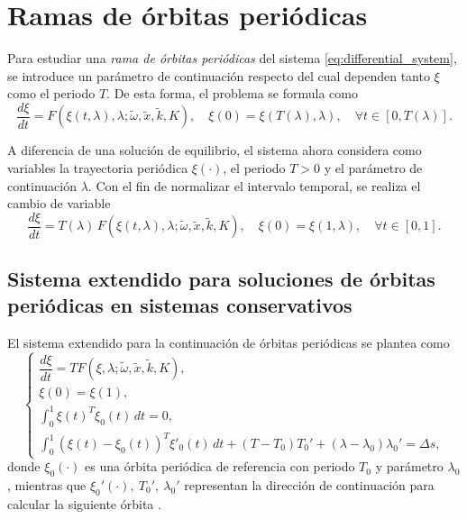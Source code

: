 \section{Ramas de órbitas periódicas}

Para estudiar una \emph{rama de órbitas periódicas} del sistema \eqref{eq:differential_system},
se introduce un parámetro de continuación respecto del cual dependen tanto
$\xi$ como el periodo $T$. De esta forma, el problema se formula como
\begin{equation}
    \dfrac{d\xi}{dt} = F(\xi(t, \lambda), \lambda ; \tilde{\omega}, \tilde{x}, \tilde{k}, K), \quad
    \xi(0) = \xi(T(\lambda), \lambda), \quad \forall t \in [0,T(\lambda)].
    \label{eq:orbit_param}
\end{equation}

A diferencia de una solución de equilibrio, el sistema ahora considera como variables
la trayectoria periódica $ \xi(\cdot) $, el periodo $ T > 0 $ y el parámetro de continuación $\lambda$.
Con el fin de normalizar el intervalo temporal, se realiza el cambio de variable \cite{Doedel2007}
\begin{equation}
    \dfrac{d\xi}{dt} = T(\lambda)\, F(\xi(t, \lambda), \lambda ; \tilde{\omega}, \tilde{x}, \tilde{k}, K), \quad
    \xi(0) = \xi(1, \lambda), \quad \forall t \in [0,1].
    \label{eq:orbit_one}
\end{equation}


\subsection{Sistema extendido para soluciones de órbitas periódicas en sistemas conservativos}

El sistema extendido para la continuación de órbitas periódicas se plantea como
\begin{equation}
    \begin{cases}
        \dfrac{d\xi}{dt} = T F(\xi, \lambda; \tilde{\omega}, \tilde{x}, \tilde{k}, K), \\[1mm]
        \xi(0) = \xi(1),                                                               \\[1mm]
        \int_0^1 \xi(t)^{T} \dot{\xi}_0(t) \, dt = 0,                                  \\[1mm]
        \int_0^1 (\xi(t) - \xi_0(t))^{T} \xi'_0(t)\, dt
        + (T - T_0) T_0' + (\lambda - \lambda_0)\lambda_0' = \Delta s ,
    \end{cases}
    \label{eq:orbit_sistem}
\end{equation}
donde $ \xi_0(\cdot) $ es una órbita periódica de referencia con periodo $T_0$ y parámetro $\lambda_0$, mientras que
$ \xi_0'(\cdot),\ T_0',\ \lambda_0' $ representan la dirección de continuación para calcular la siguiente órbita
\cite{Doedel2007}.

